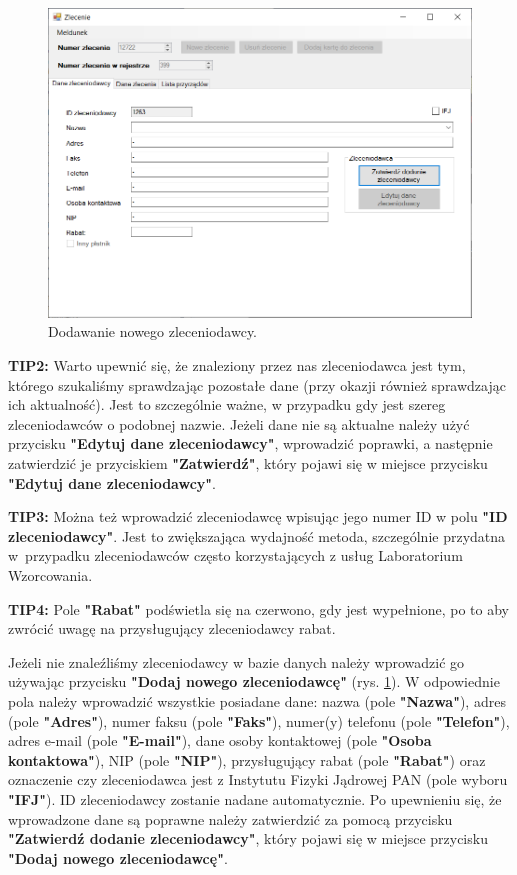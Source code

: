 \begin{figure}[htb]
	\centering
	\includegraphics[width=\columnwidth]{obrazki/Biuro/zlecenie/zlecenie_dodanie_zleceniodawcy.png}
	\caption{Dodawanie nowego zleceniodawcy.}
	\label{zlecenieDodanieZleceniodawcy}
\end{figure}

\textbf{TIP2:} Warto upewnić się, że znaleziony przez nas zleceniodawca jest tym, którego szukaliśmy sprawdzając pozostałe dane (przy okazji również sprawdzając ich aktualność). Jest to szczególnie ważne, w przypadku gdy jest szereg zleceniodawców o podobnej nazwie. Jeżeli dane nie są aktualne należy użyć przycisku \textbf{"Edytuj dane zleceniodawcy"}, wprowadzić poprawki, a następnie zatwierdzić je przyciskiem \textbf{"Zatwierdź"}, który pojawi się w miejsce przycisku \textbf{"Edytuj dane zleceniodawcy"}.

\textbf{TIP3:} Można też wprowadzić zleceniodawcę wpisując jego numer ID w polu \textbf{"ID zleceniodawcy"}. Jest to zwiększająca wydajność metoda, szczególnie przydatna w~przypadku zleceniodawców często korzystających z usług Laboratorium Wzorcowania.

\textbf{TIP4:} Pole \textbf{"Rabat"} podświetla się na czerwono, gdy jest wypełnione, po to aby zwrócić uwagę na przysługujący zleceniodawcy rabat.

Jeżeli nie znaleźliśmy zleceniodawcy w bazie danych należy wprowadzić go używając przycisku \textbf{"Dodaj nowego zleceniodawcę"} (rys. \ref{zlecenieDodanieZleceniodawcy}). W odpowiednie pola należy wprowadzić wszystkie posiadane dane: nazwa (pole \textbf{"Nazwa"}), adres (pole \textbf{"Adres"}), numer faksu (pole \textbf{"Faks"}), numer(y) telefonu (pole \textbf{"Telefon"}), adres e-mail (pole \textbf{"E-mail"}), dane osoby kontaktowej (pole \textbf{"Osoba kontaktowa"}), NIP (pole \textbf{"NIP"}), przysługujący rabat (pole \textbf{"Rabat"}) oraz oznaczenie czy zleceniodawca jest z Instytutu Fizyki Jądrowej PAN (pole wyboru  \textbf{"IFJ"}). ID zleceniodawcy zostanie nadane automatycznie. Po upewnieniu się, że wprowadzone dane są poprawne należy zatwierdzić za pomocą przycisku \textbf{"Zatwierdź dodanie zleceniodawcy"}, który pojawi się w miejsce przycisku \textbf{"Dodaj nowego zleceniodawcę"}.

